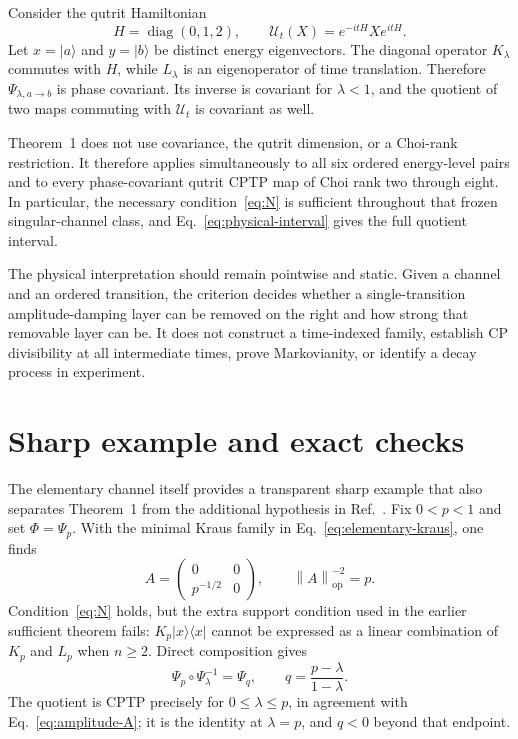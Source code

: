 \documentclass[aip,jmp,preprint]{revtex4-2}
\newcommand{\opnorm}[1]{\left\lVert #1\right\rVert_{\mathrm{op}}}
\begin{document}
Consider the qutrit Hamiltonian
\begin{equation}
 H=\operatorname{diag}(0,1,2),\qquad
 \mathcal U_t(X)=e^{-itH}Xe^{itH}.
\end{equation}
Let $x=|a\rangle$ and $y=|b\rangle$ be distinct energy eigenvectors.  The diagonal operator $K_\lambda$ commutes with $H$, while $L_\lambda$ is an eigenoperator of time translation.  Therefore $\Psi_{\lambda,a\to b}$ is phase covariant.  Its inverse is covariant for $\lambda<1$, and the quotient of two maps commuting with $\mathcal U_t$ is covariant as well.

Theorem~1 does not use covariance, the qutrit dimension, or a Choi-rank restriction.  It therefore applies simultaneously to all six ordered energy-level pairs and to every phase-covariant qutrit CPTP map of Choi rank two through eight.  In particular, the necessary condition~\eqref{eq:N} is sufficient throughout that frozen singular-channel class, and Eq.~\eqref{eq:physical-interval} gives the full quotient interval.

The physical interpretation should remain pointwise and static.  Given a channel and an ordered transition, the criterion decides whether a single-transition amplitude-damping layer can be removed on the right and how strong that removable layer can be.  It does not construct a time-indexed family, establish CP divisibility at all intermediate times, prove Markovianity, or identify a decay process in experiment.

\section{Sharp example and exact checks}

The elementary channel itself provides a transparent sharp example that also separates Theorem~1 from the additional hypothesis in Ref.~.  Fix $0<p<1$ and set $\Phi=\Psi_p$.  With the minimal Kraus family in Eq.~\eqref{eq:elementary-kraus}, one finds
\begin{equation}
 A=\begin{pmatrix}0&0\\p^{-1/2}&0\end{pmatrix},
 \qquad \opnorm{A}^{-2}=p . \label{eq:amplitude-A}
\end{equation}
Condition~\eqref{eq:N} holds, but the extra support condition used in the earlier sufficient theorem fails: $K_p|x\rangle\langle x|$ cannot be expressed as a linear combination of $K_p$ and $L_p$ when $n\geq2$.  Direct composition gives
\begin{equation}
 \Psi_p\circ\Psi_\lambda^{-1}=\Psi_q,
 \qquad q=\frac{p-\lambda}{1-\lambda}. \label{eq:composition-example}
\end{equation}
The quotient is CPTP precisely for $0\leq\lambda\leq p$, in agreement with Eq.~\eqref{eq:amplitude-A}; it is the identity at $\lambda=p$, and $q<0$ beyond that endpoint.
\end{document}
